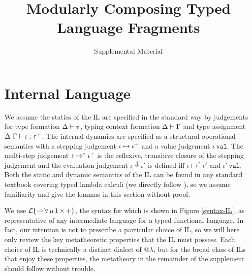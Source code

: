 \documentclass[10pt,preprint]{sigplanconf}
\newcommand{\moutput}{^{\color{gray}+}}
\begin{document}
\conferenceinfo{-}{-} 
\copyrightyear{-} 
\copyrightdata{[to be supplied]} 


\title{Modularly Composing Typed Language Fragments}
\subtitle{Supplemental Material}
\authorinfo{}{}{}

\maketitle


\section{Internal Language}
We assume the statics of the IL are specified in the standard way by judgements for  type formation {$\Delta \vdash \tau$}, typing context formation { $\Delta \vdash \Gamma$} and type assignment {$\iDelta~\iGamma \vdash \iota : \tau\moutput$}. 
The internal dynamics are specified as a structural operational semantics with a stepping judgement {\small $\iota \mapsto \iota\moutput$} and a value judgement {$\iota~\mathtt{val}$}. The multi-step judgement $\iota \mapsto^{*} \iota\moutput$ is the reflexive, transitive closure of the stepping judgement and the evaluation judgement $\iota \Downarrow \iota'$ is defined iff $\iota \mapsto^{*} \iota'$ and $\iota'~\mathtt{val}$. Both the static and dynamic semantics of the IL can be found in any standard textbook covering typed lambda calculi (we directly follow \cite{pfpl}), so we assume familiarity and give the lemmas in this section without proof.

We use {$\mathcal{L}\{{\rightharpoonup}\,{\forall}\,{\mu}\,{{\sf 1}}\,{\times}\,{+}\}$}, the syntax for which is shown in Figure \ref{syntax-IL}, as representative of any intermediate language for a typed functional language. In fact, our intention is not to prescribe a particular choice of IL, so we will here only review the key metatheoretic properties that the IL must possess. Each choice of IL is technically a distinct dialect of @$\lambda$, but for the broad class of ILs that enjoy these properties, the metatheory in the remainder of the supplement should follow without trouble.
\end{document}
